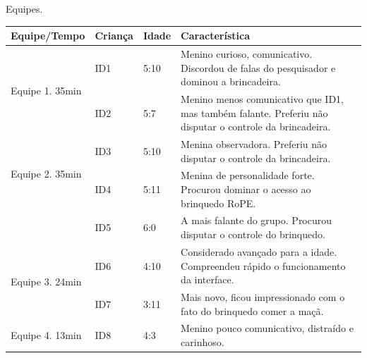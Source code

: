 \begin{quadro}[!h]
    \caption{Equipes.}
    \label{quadro:equipes}
    \centering
    {
        \begin{footnotesize}
        {\renewcommand{\arraystretch}{1.2}
        \begin{tabular}{|l|l|l|p{11cm}|} 
            \hline
            \textbf{ Equipe/Tempo }                         & \textbf{Criança } & \textbf{Idade} & \textbf{Característica} \\ 
            \hline
            \multirow{2}{*}{Equipe 1. 35min}                & ID1               & 5:10                         & Menino curioso, comunicativo. Discordou de falas do pesquisador e dominou a brincadeira.                           \\ 
            \cline{2-4}
                                                            & ID2               & 5:7                          & Menino menos comunicativo que ID1, mas também falante. Preferiu não disputar o controle da brincadeira.            \\ 
            \hline
            \multirow{2}{*}{Equipe 2. 35min}                & ID3               & 5:10                         & Menina observadora. Preferiu não disputar o controle da brincadeira.                                               \\ 
            \cline{2-4}
            \multicolumn{1}{|c|}{}                          & ID4               & 5:11                         & Menina de personalidade forte. Procurou dominar o acesso ao brinquedo RoPE.                                        \\ 
            \cline{2-4}
            \multicolumn{1}{|c|}{}                          & ID5               & 6:0                          & A mais falante do grupo. Procurou disputar o controle do brinquedo.                                                \\ 
            \hline
            \multirow{2}{*}{Equipe 3. 24min}                & ID6               & 4:10                         & Considerado avançado para a idade. Compreendeu rápido o funcionamento da interface.                                \\ 
            \cline{2-4}
                                                            & ID7               & 3:11                         & Mais novo, ficou impressionado com o fato do brinquedo comer a maçã.                                               \\ 
            \hline
            Equipe 4. 13min                                 & ID8               & 4:3                          & Menino pouco comunicativo, distraído e carinhoso.                                                                  \\ 

\end{tabular}}
\end{footnotesize}}
\end{quadro}
